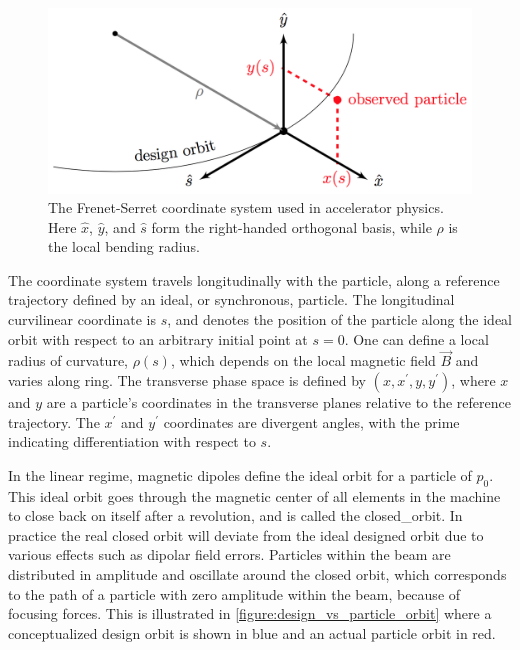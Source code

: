 \begin{figure}[!htb]
    \centering
    \includegraphics[width = 0.8\linewidth]{Figures/Beam_Dynamics_Theory/Frenet_Serret_Coordinate_System.png}
    \caption{The Frenet-Serret coordinate system used in accelerator physics. Here \(\hat{x}\), \(\hat{y}\), and \(\hat{s}\) form the right-handed orthogonal basis, while \(\rho\) is the local bending radius.}
    \label{figure:frenet_serret_system}
\end{figure}

The coordinate system travels longitudinally with the particle, along a reference trajectory defined by an ideal, or \gls{synchronous}, particle.
The longitudinal curvilinear coordinate is \(s\), and denotes the position of the particle along the ideal orbit with respect to an arbitrary initial point at \(s = 0\).
One can define a local radius of curvature, \(\rho(s)\), which depends on the local magnetic field \(\vec{B}\) and varies along ring.
The transverse phase space is defined by \((x, x^{\prime}, y, y^{\prime})\), where \(x\) and \(y\) are a particle's coordinates in the transverse planes relative to the reference trajectory.
The \(x^{\prime}\) and \(y^{\prime}\) coordinates are divergent angles, with the prime indicating differentiation with respect to \(s\).
\break

In the linear regime, magnetic dipoles define the ideal orbit for a particle of  \(p_0\).
This ideal orbit goes through the magnetic center of all elements in the machine to close back on itself after a revolution, and is called the \gls{closed_orbit}.
In practice the real closed orbit will deviate from the ideal designed orbit due to various effects such as dipolar field errors.
Particles within the beam are distributed in amplitude and oscillate around the closed orbit, which corresponds to the path of a particle with zero amplitude within the beam, because of focusing forces. 
This is illustrated in \cref{figure:design_vs_particle_orbit} where a conceptualized design orbit is shown in blue and an actual particle orbit in red.

